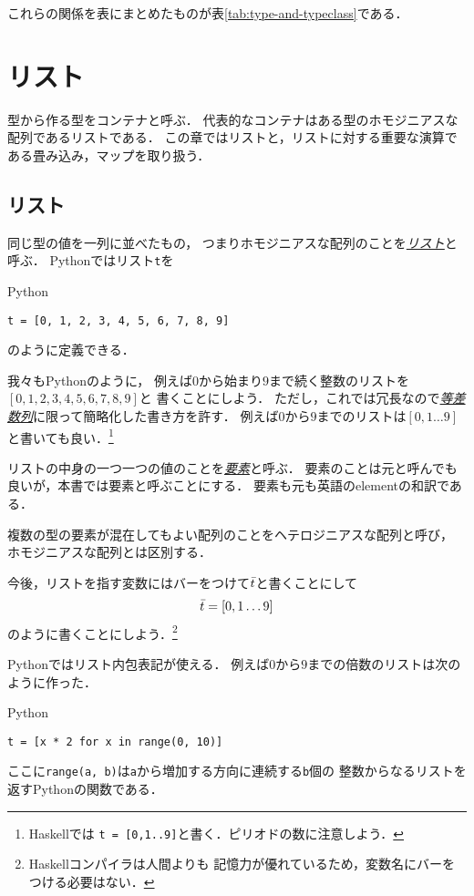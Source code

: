 \documentclass[a5paper,draft]{jsbook}
\newcommand{\programminglanguage}[1]{\textsf{#1}}
\newcommand{\haskell}{\programminglanguage{Haskell}}
\newcommand{\python}{\programminglanguage{Python}}
\newenvironment{leader}{\begingroup}{\endgroup}
\newcommand{\keyword}[1]{{\underline{\emph{#1}}}}
\newcommand{\code}[1]{\texttt{#1}}
\newenvironment{pythoncode}{\begin{itembox}[r]{\python}}{\end{itembox}}
\newcommand{\mathListVar}[1]{\Bar{#1}}
\begin{document}
これらの関係を表にまとめたものが表\ref{tab:type-and-typeclass}である．

\chapter{リスト}
\begin{leader}
型から作る型をコンテナと呼ぶ．
代表的なコンテナはある型のホモジニアスな配列であるリストである．
この章ではリストと，リストに対する重要な演算である畳み込み，マップを取り扱う．
\end{leader}


\section{リスト}

同じ型の値を一列に並べたもの，
つまりホモジニアスな配列のことを\keyword{リスト}と呼ぶ．
\python ではリスト\code{t}を
\begin{pythoncode}
\begin{verbatim}
t = [0, 1, 2, 3, 4, 5, 6, 7, 8, 9]
\end{verbatim}
\end{pythoncode}
のように定義できる．

我々も\python のように，
例えば$0$から始まり$9$まで続く整数のリストを$[0,1,2,3,4,5,6,7,8,9]$と
書くことにしよう．
ただし，これでは冗長なので\keyword{等差数列}に限って簡略化した書き方を許す．
例えば$0$から$9$までのリストは$[0,1\dots9]$と書いても良い．\footnote{\haskell では
\code{t = [0,1..9]}と書く．ピリオドの数に注意しよう．}

リストの中身の一つ一つの値のことを\keyword{要素}と呼ぶ．
要素のことは元と呼んでも良いが，本書では要素と呼ぶことにする．
要素も元も英語のelementの和訳である．

複数の型の要素が混在してもよい配列のことをヘテロジニアスな配列と呼び，
ホモジニアスな配列とは区別する．

今後，リストを指す変数にはバーをつけて$\mathListVar{t}$と書くことにして
\begin{equation}
\mathListVar{t}=[0,1\dots9]
\end{equation}
のように書くことにしよう．\footnote{\haskell コンパイラは人間よりも
記憶力が優れているため，変数名にバーをつける必要はない．}

\python ではリスト内包表記が使える．
例えば$0$から$9$までの倍数のリストは次のように作った．
\begin{pythoncode}
\begin{verbatim}
t = [x * 2 for x in range(0, 10)]
\end{verbatim}
\end{pythoncode}
ここに\code{range(a, b)}は\code{a}から増加する方向に連続する\code{b}個の
整数からなるリストを返す\python の関数である．
\end{document}

